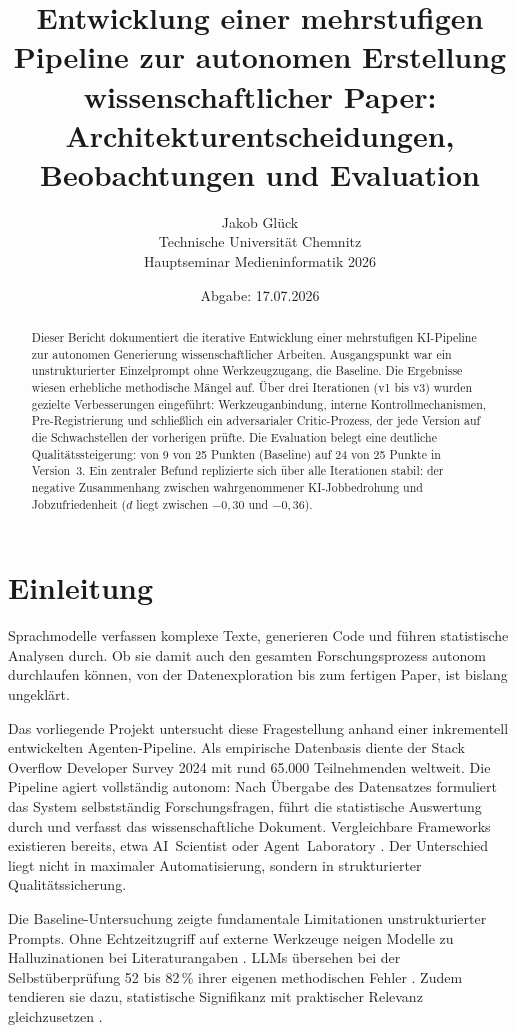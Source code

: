 \documentclass[11pt,a4paper]{article}
\title{Entwicklung einer mehrstufigen Pipeline zur autonomen
Erstellung wissenschaftlicher Paper:\\
Architekturentscheidungen, Beobachtungen und Evaluation}
\author{Jakob Gl\"uck \\[4pt]
\small Technische Universit\"at Chemnitz \\
\small Hauptseminar Medieninformatik 2026}
\date{Abgabe: 17.07.2026}
\begin{document}
\maketitle

\begin{abstract}
Dieser Bericht dokumentiert die iterative Entwicklung einer mehrstufigen KI-Pipeline
zur autonomen Generierung wissenschaftlicher Arbeiten. Ausgangspunkt war ein
unstrukturierter Einzelprompt ohne Werkzeugzugang, die Baseline. Die Ergebnisse
wiesen erhebliche methodische Mängel auf. Über drei Iterationen (v1 bis v3) wurden
gezielte Verbesserungen eingeführt: Werkzeuganbindung, interne Kontrollmechanismen,
Pre-Registrierung und schließlich ein adversarialer Critic-Prozess, der jede Version
auf die Schwachstellen der vorherigen prüfte. Die Evaluation belegt eine deutliche
Qualitätssteigerung: von 9 von 25 Punkten (Baseline) auf 24 von 25 Punkte in
Version~3. Ein zentraler Befund replizierte sich über alle Iterationen stabil: der
negative Zusammenhang zwischen wahrgenommener KI-Jobbedrohung und Jobzufriedenheit
($d$ liegt zwischen $-0{,}30$ und $-0{,}36$).
\end{abstract}

\section{Einleitung}

Sprachmodelle verfassen komplexe Texte, generieren Code und führen statistische Analysen
durch. Ob sie damit auch den gesamten Forschungsprozess autonom durchlaufen können, von der
Datenexploration bis zum fertigen Paper, ist bislang ungeklärt.

Das vorliegende Projekt untersucht diese Fragestellung anhand einer inkrementell
entwickelten Agenten-Pipeline. Als empirische Datenbasis diente der Stack Overflow
Developer Survey 2024 \cite{stackoverflow2024} mit rund 65.000 Teilnehmenden weltweit.
Die Pipeline agiert vollständig autonom: Nach Übergabe des Datensatzes formuliert das
System selbstständig Forschungsfragen, führt die statistische Auswertung durch und
verfasst das wissenschaftliche Dokument. Vergleichbare Frameworks existieren bereits,
etwa AI~Scientist \cite{lu2024aiscientist} oder Agent~Laboratory
\cite{schmidgall2025agentlab}. Der Unterschied liegt nicht in maximaler Automatisierung, sondern in strukturierter
Qualitätssicherung.

Die Baseline-Untersuchung zeigte fundamentale Limitationen unstrukturierter Prompts.
Ohne Echtzeitzugriff auf externe Werkzeuge neigen Modelle zu Halluzinationen bei
Literaturangaben \cite{rao2026detecting}. LLMs übersehen bei der Selbstüberprüfung 52 bis 82\,\% ihrer eigenen methodischen
Fehler \cite{badscientist2025}. Zudem tendieren sie dazu, statistische Signifikanz
mit praktischer Relevanz gleichzusetzen \cite{badscientist2025}.
\end{document}
